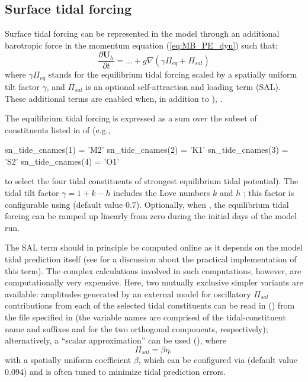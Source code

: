 \documentclass[../main/NEMO_manual]{subfiles}
\begin{document}
\subsection{Surface tidal forcing}
Surface tidal forcing can be represented in the model through an additional
barotropic force in the momentum equation (\autoref{eq:MB_PE_dyn}) such that:
\[
  \frac{\partial {\mathrm {\mathbf U}}_h }{\partial t} = \ldots +g\nabla (\gamma
  \Pi_{eq} + \Pi_{sal})
\]
where $\gamma \Pi_{eq}$ stands for the equilibrium tidal forcing scaled by a spatially
uniform tilt factor $\gamma$, and $\Pi_{sal}$ is an optional
self-attraction and loading term (SAL). These additional terms are enabled when,
in addition to ),
.\par

The equilibrium tidal forcing is expressed as a sum over the subset of
constituents listed in  of
 (e.g.,
\begin{forlines}
      sn_tide_cnames(1) = 'M2'
      sn_tide_cnames(2) = 'K1'
      sn_tide_cnames(3) = 'S2'
      sn_tide_cnames(4) = 'O1'
\end{forlines}
to select the four tidal constituents of strongest equilibrium tidal
potential). The tidal tilt factor $\gamma = 1 + k - h$ includes the
Love numbers $k$ and $h$ \citep{love_PRSL09}; this factor is
configurable using  (default value 0.7). Optionally,
when , the equilibrium tidal
forcing can be ramped up linearly from zero during the initial
 days of the model run.\par

The SAL term should in principle be computed online as it depends on
the model tidal prediction itself (see \citet{arbic.garner.ea_DSR04} for a
discussion about the practical implementation of this term). The complex
calculations involved in such computations, however, are computationally very
expensive. Here, two mutually exclusive simpler variants are available:
amplitudes generated by an external model for oscillatory $\Pi_{sal}$
contributions from each of the selected tidal constituents can be read in
() from the file specified in
 (the variable names are comprised of the
tidal-constituent name and suffixes  and  for the two
orthogonal components, respectively); alternatively, a ``scalar approximation''
can be used (), where
\[
  \Pi_{sal} = \beta \eta,
\]
with a spatially uniform coefficient $\beta$, which can be configured
via  (default value 0.094) and is
often tuned to minimize tidal prediction errors.\par
\end{document}
